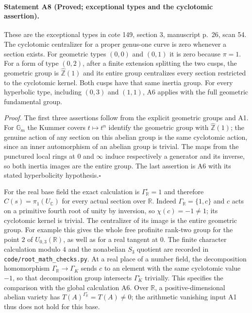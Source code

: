 \paragraph{Statement A8 (Proved; exceptional types and the cyclotomic assertion).}\label{res:A8}
These are the exceptional types in cote 149, section 3, manuscript p.~26, scan 54.
The cyclotomic centralizer for a proper genus-one curve is zero whenever a section exists. For geometric types $(0,0)$ and $(0,1)$ it is zero because $\pi=1$. For a form of type $(0,2)$, after a finite extension splitting the two cusps, the geometric group is $\widehat{\mathbb Z}(1)$ and its entire group centralizes every section restricted to the cyclotomic kernel. Both cusps have that same inertia group. For every hyperbolic type, including $(0,3)$ and $(1,1)$, A6 applies with the full geometric fundamental group.

\emph{Proof.} The first three assertions follow from the explicit geometric groups and A1. For $\mathbb G_m$ the Kummer covers $t\mapsto t^n$ identify the geometric group with $\widehat{\mathbb Z}(1)$; the genuine action of any section on this abelian group is the same cyclotomic action, since an inner automorphism of an abelian group is trivial. The maps from the punctured local rings at $0$ and $\infty$ induce respectively a generator and its inverse, so both inertia images are the entire group. The last assertion is A6 with its stated hyperbolicity hypothesis.\hfill$\square$

For the real base field the exact calculation is
$\Gamma_{\mathbb R}^{\circ}=1$ and therefore
$C(s)=\pi_1(U_{\mathbb C})$ for every actual section over $\mathbb R$.
Indeed $\Gamma_{\mathbb R}=\{1,c\}$ and $c$ acts on a primitive fourth
root of unity by inversion, so $\chi(c)=-1\ne1$; its cyclotomic kernel
is trivial. The centralizer of its image is the entire geometric group.
For example this gives the whole free profinite rank-two group for
the point $2$ of $U_{0,3}(\mathbb R)$, as well as for a real tangent at
$0$. The finite character calculation modulo $4$ and the nonabelian
$S_3$ quotient are recorded in \texttt{code/root\_math\_checks.py}.
At a real place of a number field, the decomposition homomorphism
$\Gamma_{\mathbb R}\to\Gamma_K$ sends $c$ to an element with the same
cyclotomic value $-1$, so that decomposition group intersects
$\Gamma_K^\circ$ trivially. This specifies the comparison with the
global calculation A6. Over $\mathbb R$, a positive-dimensional
abelian variety has $T(A)^{\Gamma_{\mathbb R}^\circ}=T(A)\ne0$;
the arithmetic vanishing input A1 thus does not hold for this base.
